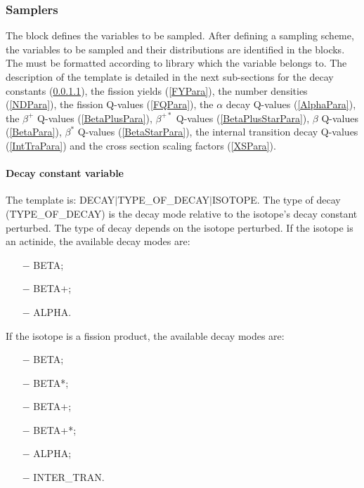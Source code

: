 \subsubsection{Samplers}
\label{subsubsection:SamplersPhisics}
The  block defines the variables to be sampled.
After defining a sampling scheme, the variables to be sampled and
their distributions are identified in the  blocks.
The  must be formatted according to library which the variable belongs to.
The description of the  template is detailed in the next sub-sections for the decay
 constants (\ref{decayPara}), the fission yields (\ref{FYPara}), the number densities (\ref{NDPara}),
the fission Q-values (\ref{FQPara}), the $\alpha$ decay Q-values (\ref{AlphaPara}), the $\beta^{+}$ Q-values
 (\ref{BetaPlusPara}), $\beta^{+*}$ Q-values (\ref{BetaPlusStarPara}), $\beta$ Q-values (\ref{BetaPara}),
$\beta^{*}$ Q-values (\ref{BetaStarPara}), the internal transition decay Q-values (\ref{IntTraPara}) and the cross
section scaling factors (\ref{XSPara}).

\paragraph{Decay constant variable} \label{decayPara}

The  template is: DECAY$\vert$TYPE\_OF\_DECAY$\vert$ISOTOPE.
The type of decay (TYPE\_OF\_DECAY) is the decay mode relative to the isotope's decay constant perturbed.
The type of decay depends on the isotope perturbed.
If the isotope is an actinide, the available decay modes are:
\begin{enumerate}
  \item [$-$]BETA;
  \item [$-$]BETA+;
  \item [$-$]ALPHA.
\end{enumerate}
If the isotope is a fission product, the available decay modes are:
\begin{enumerate}
  \item [$-$]BETA;
  \item [$-$]BETA*;
  \item [$-$]BETA+;
  \item [$-$]BETA+*;
  \item [$-$]ALPHA;
  \item [$-$]INTER\_TRAN.
\end{enumerate}

